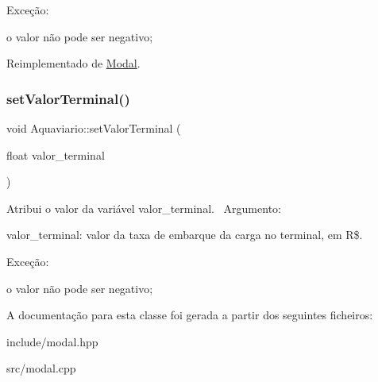Exceção\+:
\begin{DoxyItemize}
\item o valor não pode ser negativo;
\end{DoxyItemize}

Reimplementado de \hyperlink{classModal_a20cee7247cce33806d681e1d60347cc5}{Modal}.

\mbox{\label{classAquaviario_a9d2a7813c34be1532570788e15b1fd2a}} 
\subsubsection{\texorpdfstring{set\+Valor\+Terminal()}{setValorTerminal()}}
{\footnotesize\ttfamily void Aquaviario\+::set\+Valor\+Terminal (\begin{DoxyParamCaption}\item[{float}]{valor\+\_\+terminal }\end{DoxyParamCaption})}

Atribui o valor da variável valor\+\_\+terminal.~\newline
 Argumento\+:
\begin{DoxyItemize}
\item valor\+\_\+terminal\+: valor da taxa de embarque da carga no terminal, em R\$.~\newline

\end{DoxyItemize}

Exceção\+:
\begin{DoxyItemize}
\item o valor não pode ser negativo;
\end{DoxyItemize}

A documentação para esta classe foi gerada a partir dos seguintes ficheiros\+:\begin{DoxyCompactItemize}
\item 
include/modal.\+hpp\item 
src/modal.\+cpp\end{DoxyCompactItemize}
